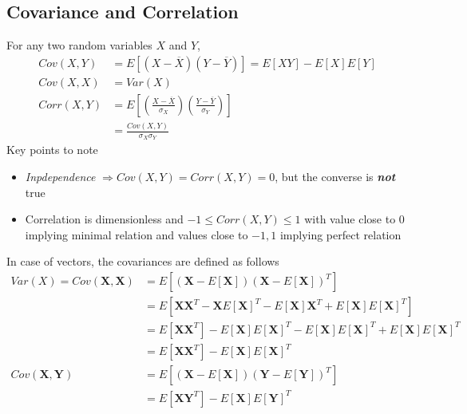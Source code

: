 \documentclass[../probability-notes.tex]{subfiles}
\begin{document}
    \subsection{Covariance and Correlation}
    For any two random variables $X$ and $Y$,
    \begin{align*}
        Cov(X,Y) &= E[(X - \overline{X})(Y - \overline{Y})] = E[XY] - E[X]E[Y]\\
        Cov(X,X) &= Var(X)\\
        Corr(X,Y) &= E[(\frac{X - \overline{X}}{\sigma_{X}}) (\frac{Y - \overline{Y}}{\sigma_{Y}})]\\
        &= \frac{Cov(X,Y)}{\sigma_{X} \sigma_{Y}}
    \end{align*}
    Key points to note
    \begin{itemize}
        \item \emph{Inpdependence} $\Rightarrow Cov(X,Y) = Corr(X,Y) = 0$, but the converse is \emph{\textbf{not}} true
        \item Correlation is dimensionless and $-1 \leq Corr(X,Y) \leq 1$ with value close to $0$ implying minimal relation and values close to $-1, 1$ implying perfect relation
    \end{itemize}

    In case of vectors, the covariances are defined as follows
    \begin{align*}
        Var(X) = Cov(\mathbf{X}, \mathbf{X}) &= E[(\mathbf{X} - E[\mathbf{X}])(\mathbf{X} - E[\mathbf{X}])^{T}]\\
        &= E[\mathbf{X}\mathbf{X}^{T} - \mathbf{X}E[\mathbf{X}]^{T} - E[\mathbf{X}]\mathbf{X}^{T} + E[\mathbf{X}]E[\mathbf{X}]^{T}]\\
        &= E[\mathbf{X}\mathbf{X}^{T}] - E[\mathbf{X}]E[\mathbf{X}]^{T} - E[\mathbf{X}]E[\mathbf{X}]^{T} + E[\mathbf{X}]E[\mathbf{X}]^{T}\\
        &= E[\mathbf{X} \mathbf{X}^{T}] - E[\mathbf{X}]E[\mathbf{X}]^{T}\\
        Cov(\mathbf{X}, \mathbf{Y}) &= E[(\mathbf{X} - E[\mathbf{X}])(\mathbf{Y} - E[\mathbf{Y}])^{T}]\\
        &= E[\mathbf{X} \mathbf{Y}^{T}] - E[\mathbf{X}]E[\mathbf{Y}]^{T}\\
    \end{align*}
\end{document}
